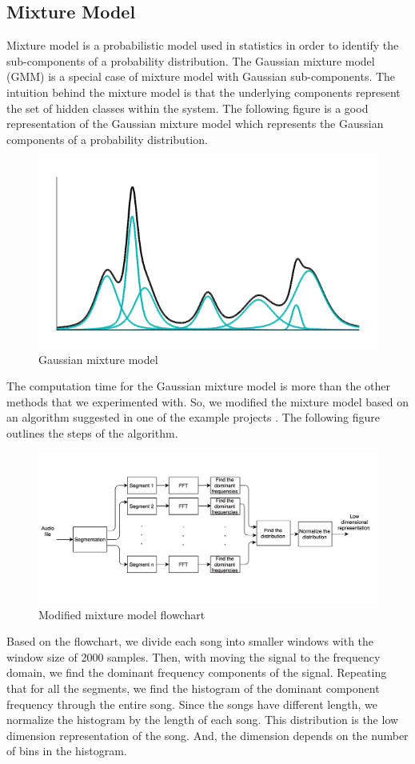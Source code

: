 \documentclass[12pt]{article}
\begin{document}
\subsection{Mixture Model}
Mixture model is a probabilistic model used in statistics in order to identify the sub-components of a probability distribution. The Gaussian mixture model (GMM) is a special case of mixture model with Gaussian sub-components. The intuition behind the mixture model is that the underlying components represent the set of hidden classes within the system. The following figure is a good representation of the Gaussian mixture model which represents the Gaussian components of a probability distribution.
\begin{figure}[H]\label{GMM}
	\centering
	\includegraphics[width=1\linewidth]{GMM.png}
	\caption{Gaussian mixture model}
\end{figure}
The computation time for the Gaussian mixture model is more than the other methods that we experimented with. So, we modified the mixture model based on an algorithm suggested in one of the example projects \cite{proj}. The following figure outlines the steps of the algorithm.
\begin{figure}[H]\label{fch}
	\centering
	\includegraphics[width=1.1\linewidth]{fch.png}
	\caption{Modified mixture model flowchart}
\end{figure}
Based on the flowchart, we divide each song into smaller windows with the window size of 2000 samples. Then, with moving the signal to the frequency domain, we find the dominant frequency components of the signal. Repeating that for all the segments, we find the histogram of the dominant component frequency through the entire song. Since the songs have different length, we normalize the histogram by the length of each song. This distribution is the low dimension representation of the song. And, the dimension depends on the number of bins in the histogram.
\end{document}
